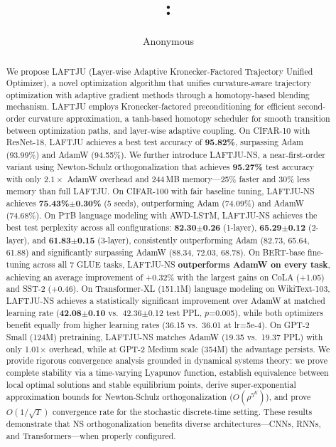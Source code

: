 \documentclass[10pt,twocolumn]{article}
\title{\method{}: \methodfull{}}
\author{
  Anonymous
}
\date{}
\newcommand{\method}{LAFTJU}
\newcommand{\methodfull}{Layer-wise Adaptive Kronecker-Factored Trajectory Unified Optimizer}
\begin{document}
\maketitle

\begin{abstract}
We propose \method{} (\methodfull{}), a novel optimization algorithm that unifies curvature-aware trajectory optimization with adaptive gradient methods through a homotopy-based blending mechanism. \method{} employs Kronecker-factored preconditioning for efficient second-order curvature approximation, a tanh-based homotopy scheduler for smooth transition between optimization paths, and layer-wise adaptive coupling. On CIFAR-10 with ResNet-18, \method{} achieves a best test accuracy of \textbf{95.82\%}, surpassing Adam (93.99\%) and AdamW (94.55\%). We further introduce \method{}-NS, a near-first-order variant using Newton-Schulz orthogonalization that achieves \textbf{95.27\%} test accuracy with only $2.1\times$ AdamW overhead and 244\,MB memory---25\% faster and 30\% less memory than full \method{}. On CIFAR-100 with fair baseline tuning, \method{}-NS achieves \textbf{75.43\%$\pm$0.30\%} (5 seeds), outperforming Adam (74.09\%) and AdamW (74.68\%). On PTB language modeling with AWD-LSTM, \method{}-NS achieves the best test perplexity across all configurations: \textbf{82.30$\pm$0.26} (1-layer), \textbf{65.29$\pm$0.12} (2-layer), and \textbf{61.83$\pm$0.15} (3-layer), consistently outperforming Adam (82.73, 65.64, 61.88) and significantly surpassing AdamW (88.34, 72.03, 68.78). On BERT-base fine-tuning across all 7 GLUE tasks, \method{}-NS \textbf{outperforms AdamW on every task}, achieving an average improvement of +0.32\% with the largest gains on CoLA (+1.05) and SST-2 (+0.46). On Transformer-XL (151.1M) language modeling on WikiText-103, \method{}-NS achieves a statistically significant improvement over AdamW at matched learning rate (\textbf{42.08$\pm$0.10} vs.\ 42.36$\pm$0.12 test PPL, $p$=0.005), while both optimizers benefit equally from higher learning rates (36.15 vs.\ 36.01 at lr=5e-4). On GPT-2 Small (124M) pretraining, \method{}-NS matches AdamW (19.35 vs.\ 19.37 PPL) with only 1.01$\times$ overhead, while at GPT-2 Medium scale (354M) the advantage persists. We provide rigorous convergence analysis grounded in dynamical systems theory: we prove complete stability via a time-varying Lyapunov function, establish equivalence between local optimal solutions and stable equilibrium points, derive super-exponential approximation bounds for Newton-Schulz orthogonalization ($O(\rho^{5^K})$), and prove $O(1/\sqrt{T})$ convergence rate for the stochastic discrete-time setting. These results demonstrate that NS orthogonalization benefits diverse architectures---CNNs, RNNs, and Transformers---when properly configured.
\end{abstract}
\end{document}
